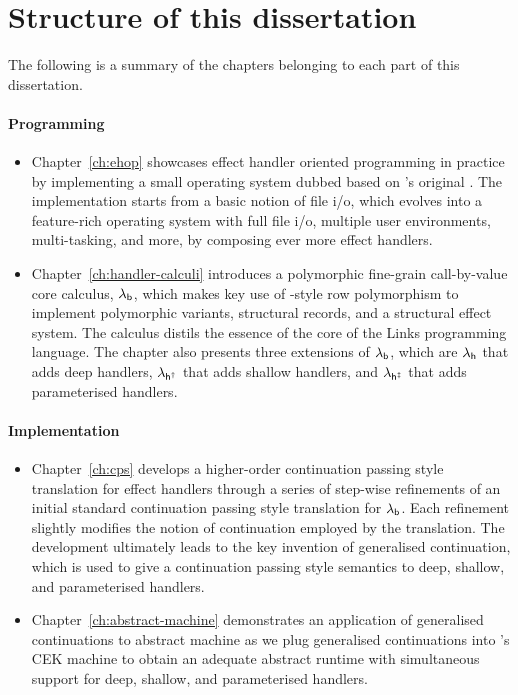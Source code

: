 \documentclass[12pt,phd,lfcs,twoside,openright,logo,leftchapter,normalheadings]{infthesis}
\theoremstyle{plain}
\theoremstyle{definition}
\begin{document}
\section{Structure of this dissertation}

The following is a summary of the chapters belonging to each part of
this dissertation.

\paragraph{Programming}
\begin{itemize}
\item Chapter~\ref{ch:ehop} showcases effect handler oriented
  programming in practice by implementing a small operating system
  dubbed \OSname{} based on \citeauthor{RitchieT74}'s original
  \UNIX{}. The implementation starts from a basic notion of file i/o,
  which evolves into a feature-rich operating system with full file
  i/o, multiple user environments, multi-tasking, and more, by
  composing ever more effect handlers.

\item Chapter~\ref{ch:handler-calculi} introduces a polymorphic
  fine-grain call-by-value core calculus, $\lambda_{\mathsf{b}}$, which makes key
  use of \citeauthor{Remy93}-style row polymorphism to implement
  polymorphic variants, structural records, and a structural effect
  system. The calculus distils the essence of the core of the Links
  programming language. The chapter also presents three extensions of
  $\lambda_{\mathsf{b}}$, which are $\lambda_{\mathsf{h}}$ that adds deep handlers, $\lambda_{\mathsf{h^\dagger}}$ that
  adds shallow handlers, and $\lambda_{\mathsf{h^{\ddagger}}}$ that adds parameterised
  handlers.
\end{itemize}

\paragraph{Implementation}
\begin{itemize}
  \item Chapter~\ref{ch:cps} develops a higher-order continuation passing
style translation for effect handlers through a series of step-wise
refinements of an initial standard continuation passing style
translation for $\lambda_{\mathsf{b}}$. Each refinement slightly modifies the notion
of continuation employed by the translation. The development
ultimately leads to the key invention of generalised continuation,
which is used to give a continuation passing style semantics to deep,
shallow, and parameterised handlers.

  \item Chapter~\ref{ch:abstract-machine} demonstrates an application of
generalised continuations to abstract machine as we plug generalised
continuations into \citeauthor{FelleisenF86}'s CEK machine to obtain
an adequate abstract runtime with simultaneous support for deep,
shallow, and parameterised handlers.
\end{itemize}
\end{document}
